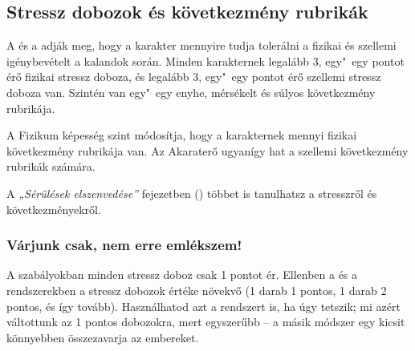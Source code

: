 \label{Stressz dobozok és következmény rubrikák}
\subsection{Stressz dobozok és következmény rubrikák}

A  és a  adják meg, hogy a karakter mennyire tudja tolerálni a fizikai és szellemi igénybevételt a kalandok során. Minden karakternek legalább 3, egy"~egy pontot érő fizikai stressz doboza, és legalább 3, egy"~egy pontot érő szellemi stressz doboza van. Szintén van egy"~egy enyhe, mérsékelt és súlyos következmény rubrikája.

A Fizikum képesség szint módosítja, hogy a karakternek mennyi fizikai következmény rubrikája van. Az Akaraterő ugyanígy hat a szellemi következmény rubrikák számára.

\begin{center}
\end{center}

A \textit{„Sérülések elszenvedése”} fejezetben () többet is tanulhatsz a stresszről és következményekről.

\subsubsection{Várjunk csak, nem erre emlékszem!}

A  szabályokban minden stressz doboz csak 1 pontot ér. Ellenben a  és a  rendszerekben a stressz dobozok értéke növekvő (1 darab 1 pontos, 1 darab 2 pontos, és így tovább). Használhatod azt a rendszert is, ha úgy tetszik; mi azért váltottunk az 1 pontos dobozokra, mert egyszerűbb -- a másik módszer egy kicsit könnyebben összezavarja az embereket.

